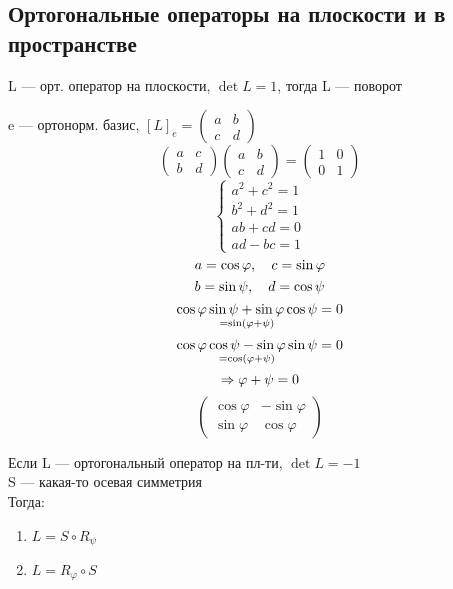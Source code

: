 \documentclass[main]{subfiles}
\begin{document}
    \newpage
    \subsection{Ортогональные операторы на плоскости и в пространстве}

    \begin{definition}
        L --- орт. оператор на плоскости, $\det L = 1$, тогда L --- поворот
    \end{definition}

    e --- ортонорм. базис, $[L]_e = \begin{pmatrix}
        a & b\\
        c & d
    \end{pmatrix}$
    \[\begin{pmatrix}
        a & c\\
        b & d
    \end{pmatrix} \begin{pmatrix}
        a & b\\
        c & d
    \end{pmatrix} = \begin{pmatrix}
        1 & 0\\
        0 & 1
    \end{pmatrix}\]
    \[\begin{cases}
        a^2 + c^2 = 1\\
        b^2 + d^2 = 1\\
        ab + cd = 0\\
        ad - bc = 1
    \end{cases}\]
    \[a = \cos \varphi,\quad c = \sin \varphi\]
    \[b = \sin \psi,\quad d = \cos \psi\]
    \[\underset{= \sin(\varphi + \psi)}{\cos \varphi \sin \psi + \sin \varphi \cos \psi} = 0\]
    \[\underset{= \cos(\varphi + \psi)}{\cos \varphi \cos \psi - \sin \varphi \sin \psi} = 0\]
    \[\Rightarrow \varphi + \psi = 0\]
    \[\begin{pmatrix}
        \cos \varphi & - \sin \varphi\\
        \sin \varphi & \cos \varphi
    \end{pmatrix}\]

    \begin{definition}
        Если L --- ортогональный оператор на пл-ти, $\det L = -1$\\
        S --- какая-то осевая симметрия\\
        Тогда:
        \begin{enumerate}
            \item $L = S \circ R_{\psi}$
            \item $L = R_{\varphi} \circ S$
        \end{enumerate}
    \end{definition}
\end{document}
